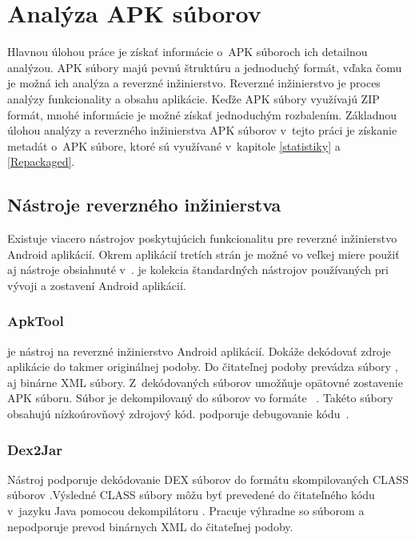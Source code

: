 \chapter{Analýza APK súborov}
\label{analyza}
Hlavnou úlohou práce je získať informácie o~APK súboroch ich detailnou analýzou. APK súbory majú pevnú štruktúru a jednoduchý formát, vďaka čomu je možná ich analýza a reverzné inžinierstvo. Reverzné inžinierstvo je proces analýzy funkcionality a obsahu aplikácie. Keďže APK súbory využívajú ZIP formát, mnohé informácie je možné získať jednoduchým rozbalením. Základnou úlohou analýzy a reverzného inžinierstva APK súborov v~tejto práci je získanie metadát o~APK súbore, ktoré sú využívané v~kapitole \ref{statistiky} a \ref{Repackaged}.

\section{Nástroje reverzného inžinierstva}
\label{nastroje_revezneho_inzinierstva}

Existuje viacero nástrojov poskytujúcich funkcionalitu pre reverzné inžinierstvo Android aplikácií. Okrem aplikácií tretích strán je možné vo veľkej miere použiť aj nástroje obsiahnuté v~.  je kolekcia štandardných nástrojov používaných pri vývoji a zostavení Android aplikácií. 

\subsection{ApkTool}
\label{ApkTool}
 je nástroj na reverzné inžinierstvo Android aplikácií. Dokáže dekódovať zdroje aplikácie do takmer originálnej podoby. Do čitateľnej podoby prevádza súbory ,  aj binárne XML súbory. Z~dekódovaných súborov umožňuje opätovné zostavenie APK súboru. Súbor  je dekompilovaný do súborov vo formáte ~\cite{Nolan2012a}. Takéto súbory obsahujú nízkoúrovňový zdrojový kód.  podporuje debugovanie  kódu~\cite{apkTool}.

\subsection{Dex2Jar}
\label{Dex2Jar}
Nástroj  podporuje dekódovanie DEX súborov do formátu skompilovaných CLASS súborov .Výsledné CLASS súbory môžu byť prevedené do čitateľného kódu v~jazyku Java pomocou dekompilátoru . Pracuje výhradne so súborom  a nepodporuje prevod binárnych XML do čitateľnej podoby.


